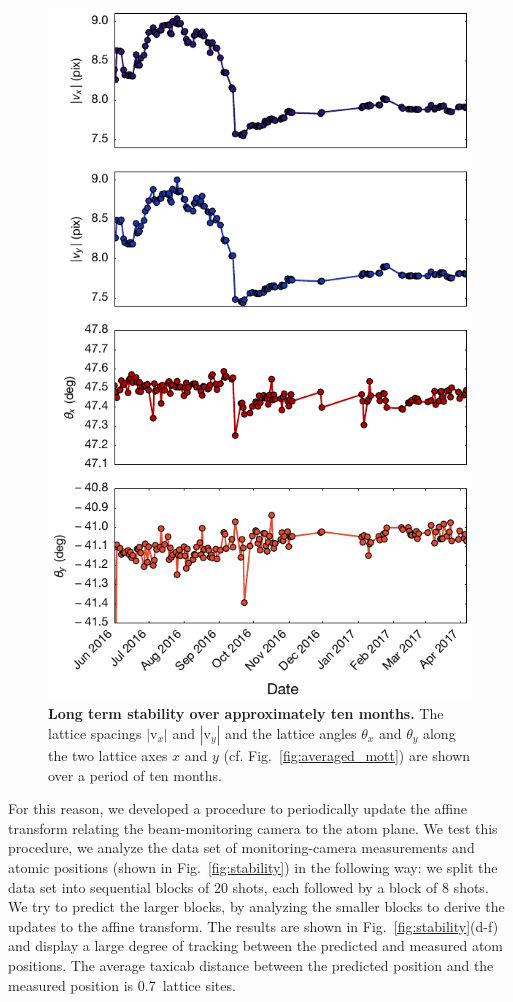 \documentclass[twocolumn,aps,pra,showpacs,preprintnumbers,bibnotes]{revtex4-1}
\begin{document}
\begin{figure}
\begin{center}
    \includegraphics[width=\columnwidth]{Figure14.pdf}
    \caption{\textbf{Long term stability over approximately ten months.} The lattice spacings $|\mathrm{v}_x|$ and $|\mathrm{v}_y|$ and the lattice angles $\theta_x$ and $\theta_y$ along the two lattice axes $x$ and $y$ (cf. Fig.~\ref{fig:averaged_mott}) are shown over a period of ten months.}\label{fig:long_term_stability}
  \end{center}
\end{figure}


For this reason, we developed a procedure to periodically update the affine transform relating the beam-monitoring camera to the atom plane.
We test this procedure, we analyze the data set of monitoring-camera measurements and atomic positions (shown in Fig.~\ref{fig:stability}) in the following way: we split the data set into sequential blocks of 20 shots, each followed by a block of 8 shots.
We try to predict the larger blocks, by analyzing the smaller blocks to derive the updates to the affine transform.
The results are shown in Fig.~\ref{fig:stability}(d-f) and display a large degree of tracking between the predicted and measured atom positions.
The average taxicab distance between the predicted position and the measured position is 0.7~lattice sites.
\end{document}
